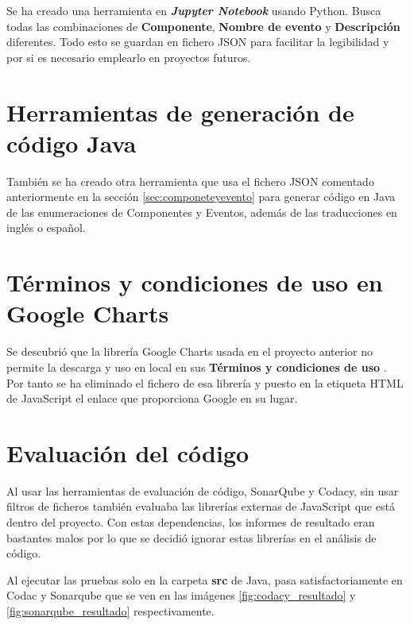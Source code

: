 Se ha creado una herramienta en \textbf{\textit{Jupyter Notebook}} usando Python. Busca todas las combinaciones de \textbf{Componente}, \textbf{Nombre de evento} y \textbf{Descripción} diferentes. Todo esto se guardan en fichero JSON para facilitar la legibilidad y por si es necesario emplearlo en proyectos futuros.


\section{Herramientas de generación de código Java}

También se ha creado otra herramienta que usa el fichero JSON comentado anteriormente en la sección \ref{sec:componeteyevento} para generar código en Java de las enumeraciones de Componentes y Eventos, además de las traducciones en inglés o español.

\section{Términos y condiciones de uso en Google Charts}
Se descubrió que la librería Google Charts usada en el proyecto anterior no permite la descarga y uso en local en sus \textbf{Términos y condiciones de uso} \cite{noauthor_frequently_nodate}. Por tanto se ha eliminado el fichero de esa librería y puesto en la etiqueta HTML de JavaScript el enlace que proporciona Google \cite{noauthor_quick_nodate} en su lugar.

\section{Evaluación del código}

Al usar las herramientas de evaluación de código, SonarQube y Codacy, sin usar filtros de ficheros también evaluaba las librerías externas de JavaScript que está dentro del proyecto. Con estas dependencias, los informes de resultado eran bastantes malos por lo que se decidió ignorar estas librerías en el análisis de código.

Al ejecutar las pruebas solo en la carpeta \textbf{src} de Java, pasa satisfactoriamente en Codac\cite{noauthor_ubumonitor_nodate-1} y Sonarqube \cite{noauthor_ubumonitor_nodate} que se ven en las imágenes \ref{fig:codacy_resultado} y \ref{fig:sonarqube_resultado} respectivamente.






